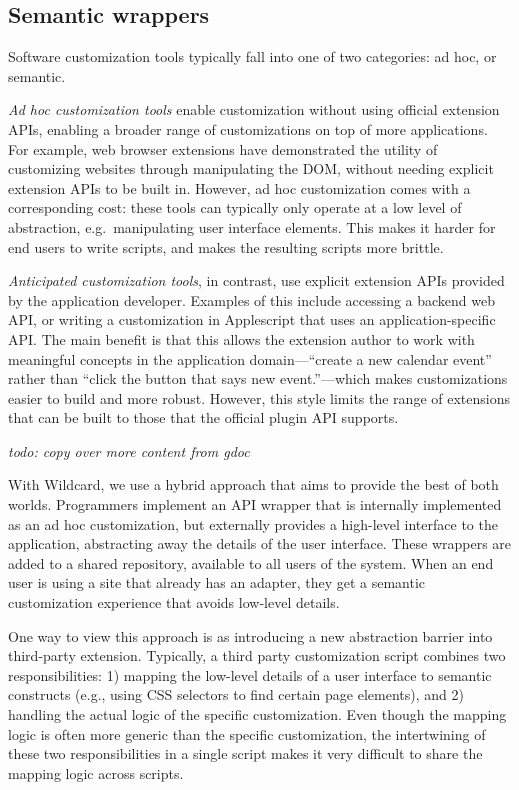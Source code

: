 \documentclass[sigplan,screen,10pt,anonymous,review]{acmart}
\begin{document}
\hypertarget{semantic-wrappers}{%
\subsection{Semantic wrappers}\label{semantic-wrappers}}

Software customization tools typically fall into one of two categories:
ad hoc, or semantic.

\emph{Ad hoc customization tools} enable customization without using
official extension APIs, enabling a broader range of customizations on
top of more applications. For example, web browser extensions have
demonstrated the utility of customizing websites through manipulating
the DOM, without needing explicit extension APIs to be built in.
However, ad hoc customization comes with a corresponding cost: these
tools can typically only operate at a low level of abstraction,
e.g.~manipulating user interface elements. This makes it harder for end
users to write scripts, and makes the resulting scripts more brittle.

\emph{Anticipated customization tools}, in contrast, use explicit
extension APIs provided by the application developer. Examples of this
include accessing a backend web API, or writing a customization in
Applescript that uses an application-specific API. The main benefit is
that this allows the extension author to work with meaningful concepts
in the application domain---``create a new calendar event'' rather than
``click the button that says new event.''---which makes customizations
easier to build and more robust. However, this style limits the range of
extensions that can be built to those that the official plugin API
supports.

\emph{todo: copy over more content from gdoc}

With Wildcard, we use a hybrid approach that aims to provide the best of
both worlds. Programmers implement an API wrapper that is internally
implemented as an ad hoc customization, but externally provides a
high-level interface to the application, abstracting away the details of
the user interface. These wrappers are added to a shared repository,
available to all users of the system. When an end user is using a site
that already has an adapter, they get a semantic customization
experience that avoids low-level details.

One way to view this approach is as introducing a new abstraction
barrier into third-party extension. Typically, a third party
customization script combines two responsibilities: 1) mapping the
low-level details of a user interface to semantic constructs (e.g.,
using CSS selectors to find certain page elements), and 2) handling the
actual logic of the specific customization. Even though the mapping
logic is often more generic than the specific customization, the
intertwining of these two responsibilities in a single script makes it
very difficult to share the mapping logic across scripts.
\end{document}
